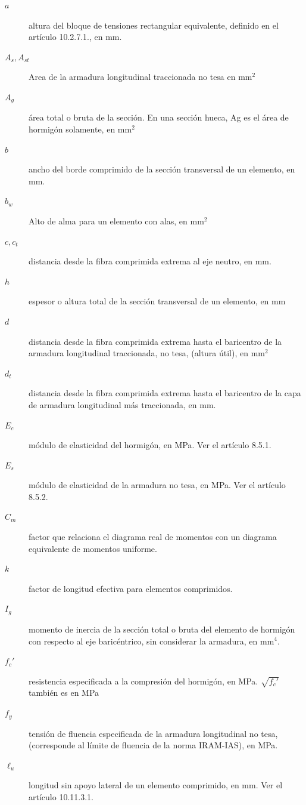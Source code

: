 \documentclass[twocolumn]{article}
\begin{document}
\begin{description}
	\item[$a$] altura del bloque de tensiones rectangular equivalente, definido en el artículo 10.2.7.1., en mm.
	\item[$A_s,A_{st}$] Area de la armadura longitudinal traccionada no tesa en mm$^2$
	\item[$A_g$] área total o bruta de la sección. En una sección hueca, Ag es el área de
	hormigón solamente, en mm$^2$
	\item[$b$] ancho del borde comprimido de la sección transversal de un elemento, en mm.
	\item[$b_w$] Alto de alma para un elemento con alas, en mm$^2$
	\item[$c,c_t$] distancia desde la fibra comprimida extrema al eje neutro, en mm.
	\item[$h$] espesor o altura total de la sección transversal de un elemento, en mm
	\item[$d$] distancia desde la fibra comprimida extrema hasta el baricentro de la armadura longitudinal traccionada, no tesa, (altura útil), en mm$^2$
	\item[$d_t$] distancia desde la fibra comprimida extrema hasta el baricentro de la capa de armadura longitudinal más traccionada, en mm.
	\item[$E_c$] módulo de elasticidad del hormigón, en MPa. Ver el artículo 8.5.1.
	\item[$E_s$] módulo de elasticidad de la armadura no tesa, en MPa. Ver el artículo 8.5.2.
	\item[$C_m$] factor que relaciona el diagrama real de momentos con un diagrama equivalente de momentos uniforme.
	\item[$k$] factor de longitud efectiva para elementos comprimidos.
	\item[$I_g$] momento de inercia de la sección total o bruta del elemento de hormigón con respecto al eje baricéntrico, sin considerar la armadura, en mm$^4$.
	\item[$f_c'$] resistencia especificada a la compresión del hormigón, en MPa. $\sqrt{f_c'}$ también es en MPa
	\item[$f_y$] tensión de fluencia especificada de la armadura longitudinal no tesa, (corresponde
	al límite de fluencia de la norma IRAM-IAS), en MPa.
	\item[$\ell_u$] longitud sin apoyo lateral de un elemento comprimido, en mm. Ver el artículo 10.11.3.1.
	

\end{description}
\end{document}
